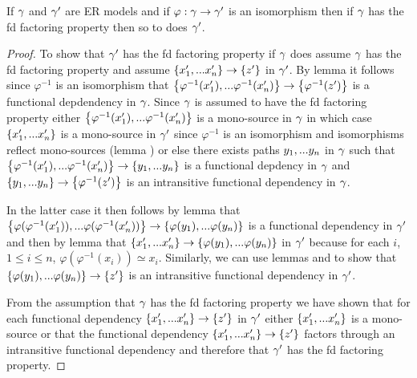 \begin{lemma}
If $\gamma$ and $\gamma'$ are ER models and if $\varphi:\gamma \rightarrow \gamma'$ is an isomorphism
then if $\gamma$ has the fd factoring property then so to does $\gamma'$.
\end{lemma}
\begin{proof}
To show that $\gamma'$ has the fd factoring property if $\gamma$ does assume $\gamma$ has the fd factoring property and assume $\left\{x'_1,...x'_n\right\} \rightarrow \left\{z'\right\}$ in $\gamma'$. 
By lemma  it follows since $\varphi^{-1}$ is an isomorphism that $\left\{\varphi^{-1}(x'_1),...\varphi^{-1}(x'_n)\right\} \rightarrow \left\{\varphi^{-1}(z')\right\}$ is a functional depdendency
in $\gamma$. Since $\gamma$ is assumed to have the fd factoring property either $\left\{\varphi^{-1}(x'_1),...\varphi^{-1}(x'_n)\right\}$ is a mono-source in $\gamma$ in which case $\left\{x'_1,...x'_n\right\}$ is a mono-source in 
$\gamma'$ since $\varphi^{-1}$ is an isomorphism  and isomorphisms reflect mono-sources (lemma ) or else there exists paths $y_1,...y_n$ in $\gamma$ such that
$\left\{\varphi^{-1}(x'_1),...\varphi^{-1}(x'_n)\right\} \rightarrow \left\{y_1,...y_n\right\}$ is a functional depdency in $\gamma$ and 
 $\left\{y_1,...y_n\right\} \rightarrow \left\{\varphi^{-1}(z')\right\}$ is an intransitive functional dependency in $\gamma$.  

In the latter case it then follows by lemma
 that
 $\left\{\varphi(\varphi^{-1}(x'_1)),...\varphi(\varphi^{-1}(x'_n))\right\} \rightarrow \left\{\varphi(y_1),...\varphi(y_n)\right\}$
is a functional dependency in $\gamma'$
and then by lemma   that $\left\{x'_1,...x'_n\right\} \rightarrow \left\{\varphi(y_1),...\varphi(y_n)\right\}$ in $\gamma'$
because for each $i$, $1 \leq i \leq n$, $\varphi(\varphi^{-1}(x_i)) \simeq x_i$.
Similarly, we can use lemmas  and  to show that $\left\{\varphi(y_1),...\varphi(y_n)\right\} \rightarrow \left\{z'\right\}$ is an intransitive functional dependency in $\gamma'$. 

From the assumption that $\gamma$ has the fd factoring property we have shown that for each functional dependency $\left\{x'_1,...x'_n\right\} \rightarrow \left\{z'\right\}$ in $\gamma'$ either $\left\{x'_1,...x'_n\right\}$ is a mono-source  or
that the functional dependency  $\left\{x'_1,...x'_n\right\} \rightarrow \left\{z'\right\}$ factors through an intransitive functional dependency and  therefore that $\gamma'$ has the fd factoring property.
\end{proof}


